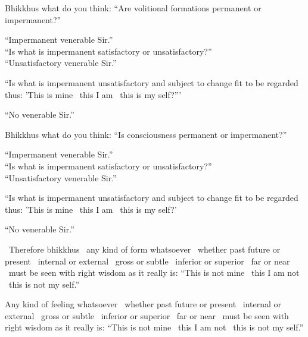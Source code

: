 \begin{english-only-nohang}
  \begin{english-only-hang}
    Bhikkhus what do you think: ``Are volitional formations permanent or impermanent?''
  \end{english-only-hang}
  ``Impermanent venerable Sir.''\\
  ``Is what is impermanent satisfactory or unsatisfactory?''\\
  ``Unsatisfactory venerable Sir.''
  \begin{english-hangtogether}
    ``Is what is impermanent unsatisfactory and subject to change fit to be regarded thus: 'This is mine \breathmark\ this I am \breathmark\ this is my self?'''
  \end{english-hangtogether}
  ``No venerable Sir.''
\end{english-only-nohang}

\begin{english-only-nohang}
  \begin{english-only-hang}
    Bhikkhus what do you think: ``Is consciousness permanent or impermanent?''
  \end{english-only-hang}
  ``Impermanent venerable Sir.''\\
  ``Is what is impermanent satisfactory or unsatisfactory?''\\
  ``Unsatisfactory venerable Sir.''\\
  \begin{english-hangtogether}
    ``Is what is impermanent unsatisfactory and subject to change fit to be regarded thus: 'This is mine \breathmark\ this I am \breathmark\ this is my self?'
  \end{english-hangtogether}
  ``No venerable Sir.''
\end{english-only-nohang}

\begin{english-only-hang}
  \anglebracketleft\ \hspace{-0.5mm}Therefore bhikkhus \hspace{-0.5mm}\anglebracketright\ any kind of form whatsoever \breathmark\ whether past future or present \breathmark\ internal or external \breathmark\ gross or subtle \breathmark\ inferior or superior \breathmark\ far or near \breathmark\ must be seen with right wisdom as it really is: ``This is not mine \breathmark\ this I am not \breathmark\ this is not my self.''
\end{english-only-hang}

\begin{english-only-hang}
  Any kind of feeling whatsoever \breathmark\ whether past future or present \breathmark\ internal or external \breathmark\ gross or subtle \breathmark\ inferior or superior \breathmark\ far or near \breathmark\ must be seen with right wisdom as it really is: ``This is not mine \breathmark\ this I am not \breathmark\ this is not my self.''
\end{english-only-hang}

